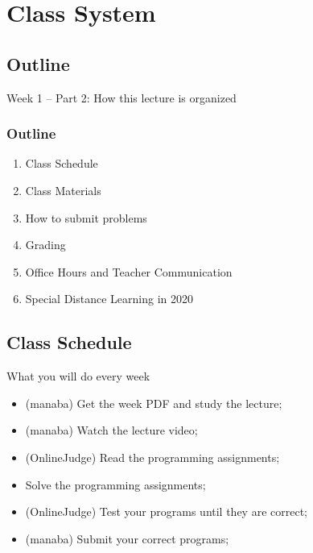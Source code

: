 
\section{Class System}
\subsection{Outline}

\begin{frame}
  \centering
  {\huge
    Week 1 -- Part 2: How this lecture is organized
  }
\end{frame}

\begin{frame}
  \frametitle{Outline}
  \begin{enumerate}
    \item Class Schedule
    \item Class Materials
    \item How to submit problems
    \item Grading
    \item Office Hours and Teacher Communication
    \item \alert{Special} Distance Learning in 2020
  \end{enumerate}
\end{frame}

\subsection{Class Schedule}
\begin{frame}{What you will do every week}
  \begin{itemize}
    \item (manaba) Get the week PDF and study the lecture;
    \medskip
    \item (manaba) Watch the lecture video;
    \medskip
    \item (OnlineJudge) Read the programming assignments;
    \medskip
    \item Solve the programming assignments;
    \medskip
    \item (OnlineJudge) Test your programs until they are correct;
    \medskip
    \item (manaba) Submit your correct programs;
  \end{itemize}
\end{frame}


